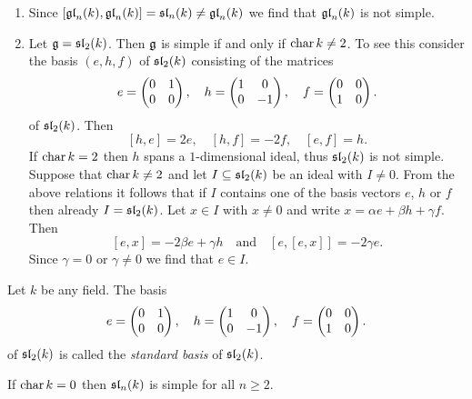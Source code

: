 \begin{expls}
 \begin{enumerate}[leftmargin=*]
  \item
   Since $[\mathfrak{gl}_n(k),\mathfrak{gl}_n(k)] = \mathfrak{sl}_n(k) \neq \mathfrak{gl}_n(k)$ we find that $\mathfrak{gl}_n(k)$ is not simple.
  \item
   Let $\mathfrak{g} = \mathfrak{sl}_2(k)$. Then $\mathfrak{g}$ is simple if and only if $\operatorname{char} k \neq 2$. To see this consider the basis $(e,h,f)$ of $\mathfrak{sl}_2(k)$ consisting of the matrices
   \[
    e = \begin{pmatrix}0 & 1 \\ 0 & 0\end{pmatrix}, \quad
    h = \begin{pmatrix}1 & 0 \\ 0 & -1\end{pmatrix}, \quad
    f = \begin{pmatrix}0 & 0 \\ 1 & 0\end{pmatrix}.
   \]
   of $\mathfrak{sl}_2(k)$. Then
   \[
    [h,e] = 2e, \quad
    [h,f] = -2f, \quad
    [e,f] = h.
   \]
   If $\operatorname{char} k = 2$ then $h$ spans a $1$-dimensional ideal, thus $\mathfrak{sl}_2(k)$ is not simple. Suppose that $\operatorname{char} k \neq 2$ and let $I \subseteq \mathfrak{sl}_2(k)$ be an ideal with $I \neq 0$. From the above relations it follows that if $I$ contains one of the basis vectors $e$, $h$ or $f$ then already $I = \mathfrak{sl}_2(k)$. Let $x \in I$ with $x \neq 0$ and write $x = \alpha e + \beta h + \gamma f$. Then
   \[
    [e,x] = -2 \beta e + \gamma h \quad \text{and} \quad [e,[e,x]] = -2 \gamma e.
   \]
   Since $\gamma = 0$ or $\gamma \neq 0$ we find that $e \in I$.
 \end{enumerate}
\end{expls}


\begin{defi}
 Let $k$ be any field. The basis
 \[
  e = \begin{pmatrix}0 & 1 \\ 0 & 0\end{pmatrix}, \quad
  h = \begin{pmatrix}1 & 0 \\ 0 & -1\end{pmatrix}, \quad
  f = \begin{pmatrix}0 & 0 \\ 1 & 0\end{pmatrix}.
 \]
 of $\mathfrak{sl}_2(k)$ is called the \emph{standard basis} of $\mathfrak{sl}_2(k)$.
\end{defi}


\begin{rem}
 If $\operatorname{char} k = 0$ then $\mathfrak{sl}_n(k)$ is simple for all $n \geq 2$.
\end{rem}